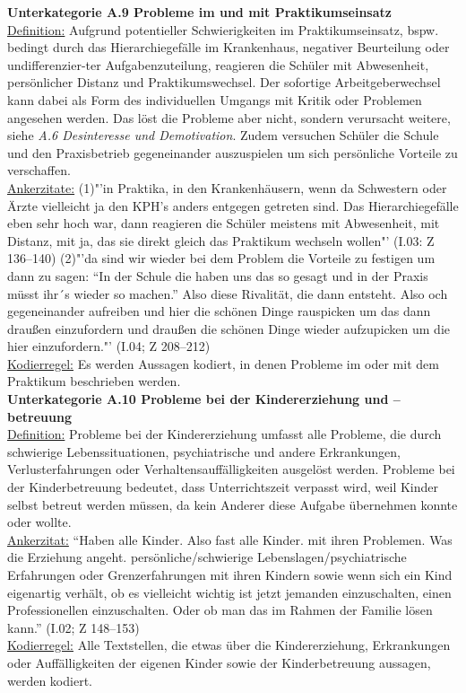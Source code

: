 \textbf{Unterkategorie A.9 Probleme im und mit Praktikumseinsatz}\\
\underline{Definition:} Aufgrund potentieller Schwierigkeiten im Praktikumseinsatz, bspw. bedingt durch das Hierarchiegefälle im Krankenhaus, negativer Beurteilung oder undifferenzier-ter Aufgabenzuteilung, reagieren die Schüler mit Abwesenheit, persönlicher Distanz und Praktikumswechsel. Der sofortige Arbeitgeberwechsel kann dabei als Form des individuellen Umgangs mit Kritik oder Problemen angesehen werden. Das löst die Probleme aber nicht, sondern verursacht weitere, siehe \textit{A.6 Desinteresse und Demotivation}. Zudem versuchen Schüler die Schule und den Praxisbetrieb gegeneinander auszuspielen um sich persönliche Vorteile zu verschaffen.\\
\underline{Ankerzitate:} (1)"'in Praktika, in den Krankenhäusern, wenn da Schwestern oder Ärzte vielleicht ja den KPH's anders entgegen getreten sind. Das Hierarchiegefälle eben sehr hoch war, dann reagieren die Schüler meistens mit Abwesenheit, mit Distanz, mit ja, das sie direkt gleich das Praktikum wechseln wollen"' (I.03: Z 136--140) (2)"'da sind wir wieder bei dem Problem die Vorteile zu festigen um dann zu sagen: "`In der Schule die haben uns das so gesagt und in der Praxis müsst ihr´s wieder so machen."' Also diese Rivalität, die dann entsteht. Also och gegeneinander aufreiben und hier die schönen Dinge rauspicken um das dann draußen einzufordern und draußen die schönen Dinge wieder aufzupicken um die hier einzufordern."' (I.04; Z 208--212)\\
\underline{Kodierregel:} Es werden Aussagen kodiert, in denen Probleme im oder mit dem Praktikum beschrieben werden.\\

\textbf{Unterkategorie A.10 Probleme bei der Kindererziehung und --betreuung}\\
\underline{Definition:} Probleme bei der Kindererziehung umfasst alle Probleme, die durch schwierige Lebenssituationen, psychiatrische und andere Erkrankungen, Verlusterfahrungen oder Verhaltensauffälligkeiten ausgelöst werden. Probleme bei der Kinderbetreuung bedeutet, dass Unterrichtszeit verpasst wird, weil Kinder selbst betreut werden müssen, da kein Anderer diese Aufgabe übernehmen konnte oder wollte. \\
\underline{Ankerzitat:} "`Haben alle Kinder. Also fast alle Kinder. mit ihren Problemen. Was die Erziehung angeht. persönliche/schwierige Lebenslagen/psychiatrische Erfahrungen oder Grenzerfahrungen mit ihren Kindern sowie wenn sich ein Kind eigenartig verhält, ob es vielleicht wichtig ist jetzt jemanden einzuschalten, einen Professionellen einzuschalten. Oder ob man das im Rahmen der Familie lösen kann."' (I.02; Z 148--153)\\
\underline{Kodierregel:} Alle Textstellen, die etwas über die Kindererziehung, Erkrankungen oder Auffälligkeiten der eigenen Kinder sowie der Kinderbetreuung aussagen, werden kodiert.\\

